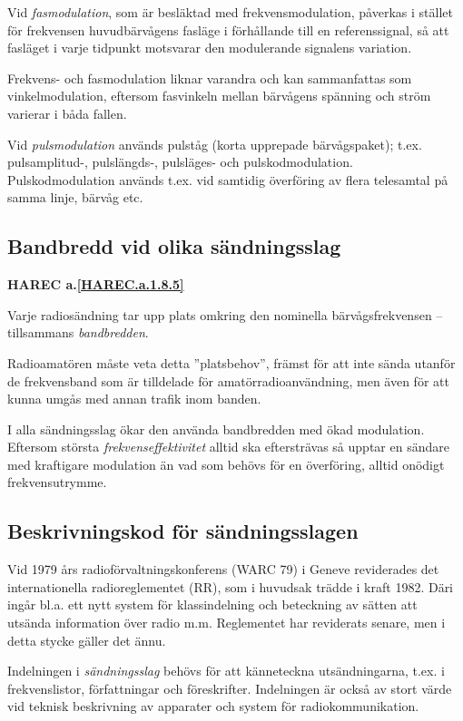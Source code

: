 Vid \emph{fasmodulation}, som är besläktad med frekvensmodulation, påverkas i
stället för frekvensen huvudbärvågens fasläge i förhållande till en
referenssignal, så att fasläget i varje tidpunkt motsvarar den modulerande
signalens variation.

Frekvens- och fasmodulation liknar varandra och kan sammanfattas som
vinkelmodulation, eftersom fasvinkeln mellan bärvågens spänning och ström
varierar i båda fallen.

Vid \emph{pulsmodulation} används pulståg (korta upprepade bärvågspaket); t.ex.
pulsamplitud-, pulslängds-, pulsläges- och pulskodmodulation.
Pulskodmodulation används t.ex. vid samtidig överföring av flera telesamtal på
samma linje, bärvåg etc.

\subsection{Bandbredd vid olika sändningsslag}
\textbf{HAREC a.\ref{HAREC.a.1.8.5}\label{myHAREC.a.1.8.5b}}

Varje radiosändning tar upp plats omkring den nominella bärvågsfrekvensen --
tillsammans \emph{bandbredden}.

Radioamatören måste veta detta ''platsbehov'', främst för att inte sända utanför
de frekvensband som är tilldelade för amatörradioanvändning, men även för att
kunna umgås med annan trafik inom banden.

I alla sändningsslag ökar den använda bandbredden med ökad modulation.
Eftersom största \emph{frekvenseffektivitet} alltid ska eftersträvas så upptar
en sändare med kraftigare modulation än vad som behövs för en överföring, alltid
onödigt frekvensutrymme.

\subsection{Beskrivningskod för sändningsslagen}

Vid 1979 års radioförvaltningskonferens (WARC 79) i Geneve reviderades det
internationella radioreglementet (RR), som i huvudsak trädde i kraft 1982.
Däri ingår bl.a. ett nytt system för klassindelning och beteckning av sätten
att utsända information över radio m.m.
Reglementet har reviderats senare, men i detta stycke gäller det ännu.

Indelningen i \emph{sändningsslag} behövs för att känneteckna utsändningarna,
t.ex. i frekvenslistor, författningar och föreskrifter.
Indelningen är också av stort värde vid teknisk beskrivning av apparater och
system för radiokommunikation.

